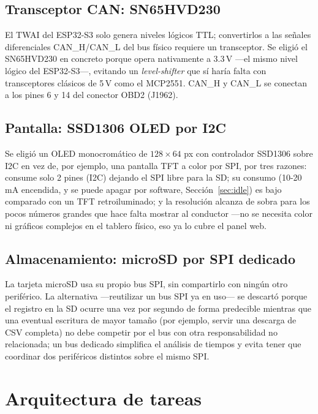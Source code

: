 \subsection{Transceptor CAN: SN65HVD230}
El TWAI del ESP32-S3 solo genera niveles lógicos TTL; convertirlos a las
señales diferenciales CAN\_H/CAN\_L del bus físico requiere un transceptor.
Se eligió el SN65HVD230 \cite{sn65hvd230_datasheet} en concreto porque opera
nativamente a 3.3\,V —el mismo nivel lógico del ESP32-S3—, evitando un
\textit{level-shifter} que sí haría falta con transceptores clásicos de 5\,V
como el MCP2551. CAN\_H y CAN\_L se conectan a los pines 6 y 14 del conector
OBD2 (J1962).

\subsection{Pantalla: SSD1306 OLED por I2C}
Se eligió un OLED monocromático de $128\times64$ px con controlador SSD1306
\cite{solomon2008ssd1306} sobre I2C en vez de, por ejemplo, una pantalla TFT
a color por SPI, por tres razones: consume solo 2 pines (I2C) dejando el SPI
libre para la SD; su consumo (10-20\,mA encendida, y se puede apagar por
software, Sección~\ref{sec:idle}) es bajo comparado con un TFT retroiluminado;
y la resolución alcanza de sobra para los pocos números grandes que hace
falta mostrar al conductor —no se necesita color ni gráficos complejos en el
tablero físico, eso ya lo cubre el panel web.

\subsection{Almacenamiento: microSD por SPI dedicado}
La tarjeta microSD usa su propio bus SPI, sin compartirlo con ningún otro
periférico. La alternativa —reutilizar un bus SPI ya en uso— se descartó
porque el registro en la SD ocurre una vez por segundo de forma predecible
mientras que una eventual escritura de mayor tamaño (por ejemplo, servir una
descarga de CSV completa) no debe competir por el bus con otra
responsabilidad no relacionada; un bus dedicado simplifica el análisis de
tiempos y evita tener que coordinar dos periféricos distintos sobre el mismo
SPI.

\section{Arquitectura de tareas}

